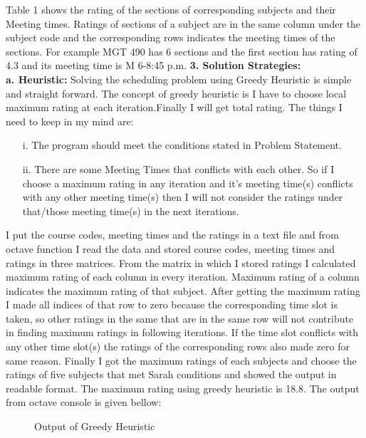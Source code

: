 \documentclass[paper=letter, fontsize=11pt]{scrartcl} %
\begin{document}
Table 1 shows the rating of the sections of corresponding subjects and their Meeting times. Ratings of sections of a subject are in the same column under the subject code and the corresponding rows indicates the meeting times of the sections. For example MGT 490 has 6 sections and the first section has rating of 4.3 and its meeting time is M 6-8:45 p.m.
\newline
\newline
\Large \textbf{3. Solution Strategies:}\\
\newline
 \normalsize \textbf{a. Heuristic:}
Solving the scheduling problem using Greedy Heuristic is simple and straight forward. The concept of greedy heuristic is 
I have to choose local maximum rating at each iteration.Finally I will get total rating. The things I need to keep in 
my mind are:  
\begin{enumerate}[align=left,style=nextline,leftmargin=1.5cm,labelsep=\parindent,font=\normalfont]
\item[i.] The program should meet the conditions stated in Problem Statement.
\item[ii.] There are some Meeting Times that conflicts with each other. So if I choose a maximum rating in any iteration and
it's meeting time(s) conflicts with any other meeting time(s) then I will not consider the ratings under that/those 
meeting time(s) in the next iterations.
\end{enumerate}  

I put the course codes, meeting times and the ratings in a text file and from octave function I read the data and stored course codes, meeting times and ratings in three matrices. From the matrix in which I stored ratings I calculated maximum rating of each column in every iteration. Maximum rating of a column indicates the maximum rating of that subject. After getting the maximum rating I made all indices of that row to zero because the corresponding time slot is taken, so other ratings in the same that are in the same row will not contribute in finding maximum ratings in following iterations. If the time slot conflicts with any other time slot(s) the ratings of the corresponding rows also made zero for same reason. Finally I got the maximum ratings of each subjects and choose the ratings of five subjects that met Sarah conditions and showed the output in readable format. The maximum rating using greedy heuristic is 18.8.
The output from octave console is given bellow:

\begin{figure}[H]
  
  \centering
    
    \caption{Output of Greedy Heuristic}
\end{figure}
\end{document}
